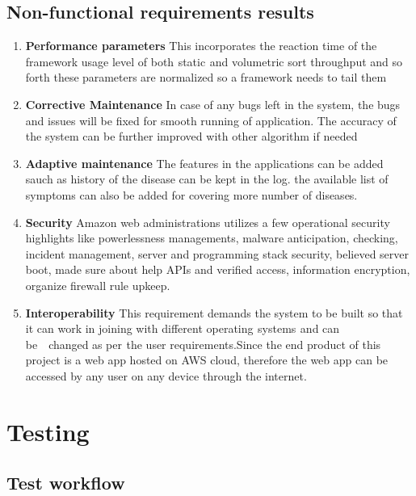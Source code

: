 \documentclass[oneside,12pt]{Classes/VTU}
\begin{document}
	\section{Non-functional requirements results}
	\begin{enumerate}
		\item \textbf{Performance parameters} This incorporates the reaction time of the framework usage level of both\tiny\textcolor{white}{s}\normalsize static\tiny\textcolor{white}{s}\normalsize and volumetric sort throughput and so forth these\tiny\textcolor{white}{f}\normalsize parameters\tiny\textcolor{white}{f}\normalsize are normalized so a framework needs to tail them
		\item \textbf{Corrective Maintenance} In case of any bugs left in the system, the bugs and issues will be fixed for smooth running of application. The accuracy of the system can be further improved with other algorithm if needed
		\item \textbf{Adaptive maintenance} The features in the applications can be added sauch as history of the disease can be kept in the log. the available list of symptoms can also be added for covering more number of diseases.
		\item \textbf{Security} Amazon web administrations utilizes a few operational security highlights like powerlessness managements, malware anticipation, checking, incident management, server and programming stack security, believed server boot, made sure about help APIs and verified access, information encryption, organize firewall rule upkeep.
		\item \textbf{Interoperability} This requirement demands the system to be built so that it can work in joining with different operating\tiny\textcolor{white}{s}\normalsize systems\tiny\textcolor{white}{s}\normalsize and can be\tiny\textcolor{white}{en}\normalsize changed\tiny\textcolor{white}{f}\normalsize as per\tiny\textcolor{white}{s}\normalsize the user requirements.Since the end product of this project is a web app hosted on AWS cloud, therefore the web app can be accessed by any user on any device through the internet. 
	\end{enumerate}
	
	
	\chapter{Testing}
	
	\section{Test workflow}
\end{document}
